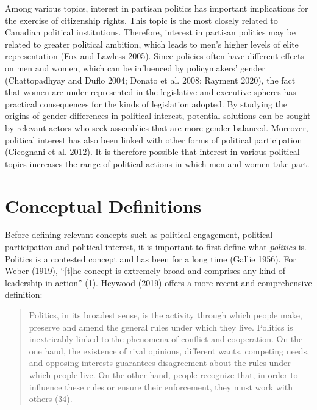 \documentclass[
  letterpaper,
  DIV=11,
  numbers=noendperiod]{scrreprt}
\begin{document}
Among various topics, interest in partisan politics has important
implications for the exercise of citizenship rights. This topic is the
most closely related to Canadian political institutions. Therefore,
interest in partisan politics may be related to greater political
ambition, which leads to men's higher levels of elite representation
(Fox and Lawless 2005). Since policies often have different effects on
men and women, which can be influenced by policymakers' gender
(Chattopadhyay and Duflo 2004; Donato et al. 2008; Rayment 2020), the
fact that women are under-represented in the legislative and executive
spheres has practical consequences for the kinds of legislation adopted.
By studying the origins of gender differences in political interest,
potential solutions can be sought by relevant actors who seek assemblies
that are more gender-balanced. Moreover, political interest has also
been linked with other forms of political participation (Cicognani et
al. 2012). It is therefore possible that interest in various political
topics increases the range of political actions in which men and women
take part.

\hypertarget{conceptual-definitions}{%
\section{Conceptual Definitions}\label{conceptual-definitions}}

Before defining relevant concepts such as political engagement,
political participation and political interest, it is important to first
define what \emph{politics} is. Politics is a contested concept and has
been for a long time (Gallie 1956). For Weber (1919), ``{[}t{]}he
concept is extremely broad and comprises any kind of leadership in
action'' (1). Heywood (2019) offers a more recent and comprehensive
definition:

\begin{quote}
Politics, in its broadest sense, is the activity through which people
make, preserve and amend the general rules under which they live.
Politics is inextricably linked to the phenomena of conflict and
cooperation. On the one hand, the existence of rival opinions, different
wants, competing needs, and opposing interests guarantees disagreement
about the rules under which people live. On the other hand, people
recognize that, in order to influence these rules or ensure their
enforcement, they must work with others (34).
\end{quote}
\end{document}
